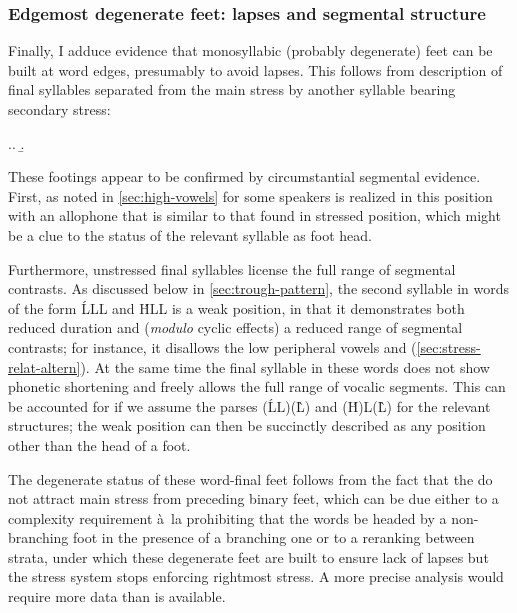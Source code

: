 \subsubsection{Edgemost degenerate feet: lapses and segmental  structure}
\label{sec:evid-from-segm}

Finally, I adduce evidence that monosyllabic (probably degenerate) feet can be built at word edges, presumably to avoid lapses. This follows from  description of final syllables separated from the main stress by another syllable bearing secondary stress:

\ex.\a.
\b.

These footings appear to be confirmed by circumstantial segmental evidence. First, as noted in \cref{sec:high-vowels} for some speakers \ipa{[ə]} is realized in this position with an allophone that is similar to that found in stressed position, which might be a clue to the status of the relevant syllable as foot head.

Furthermore, unstressed final syllables license the full range of segmental contrasts. As discussed below in \cref{sec:trough-pattern}, the second syllable in words of the form \'LLL and \'HLL is a weak position, in that it demonstrates both reduced duration and (\emph{modulo} cyclic effects) a reduced range of segmental contrasts; for instance, it disallows the low peripheral vowels \ipa{[æ]} and  \ipa{[ɒ]} (\cref{sec:stress-relat-altern}). At the same time the final syllable in these words does not show phonetic shortening and freely allows the full range of vocalic segments. This can be accounted for if we assume the parses (\'LL)(\`L) and (\'H)L(\`L) for the relevant structures; the weak position can then be succinctly described as any position other than the head of a foot.

The degenerate status of these word-final feet follows from the fact that the do not attract main stress from preceding binary feet, which can be due either to a complexity requirement à~la \citet{dresher-vdhulst} prohibiting that the words be headed by a non-branching foot in the presence of a branching one or to a reranking between strata, under which these degenerate feet are built to ensure lack of lapses but the stress system stops enforcing rightmost stress. A more precise analysis would require more data than is available.

